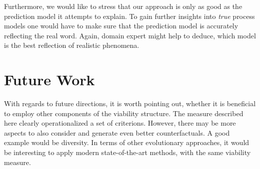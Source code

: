 \documentclass[12pt,a4paper]{report}
\begin{document}
Furthermore, we would like to stress that our approach is only as good as the prediction model it attempts to explain. To gain further insights into \emph{true} process models one would have to make sure that the prediction model is accurately reflecting the real word. Again, domain expert might help to deduce, which model is the best reflection of realistic phenomena.





\section{Future Work}
With regards to future directions, it is worth pointing out, whether it is beneficial to employ other components of the viability structure. The measure described here clearly operationalized a set of criterions. However, there may be more aspects to also consider and generate even better counterfactuals. A good example would be diversity. In terms of other evolutionary approaches, it would be interesting to apply modern state-of-the-art methods, with the same viability measure.


\end{document}
